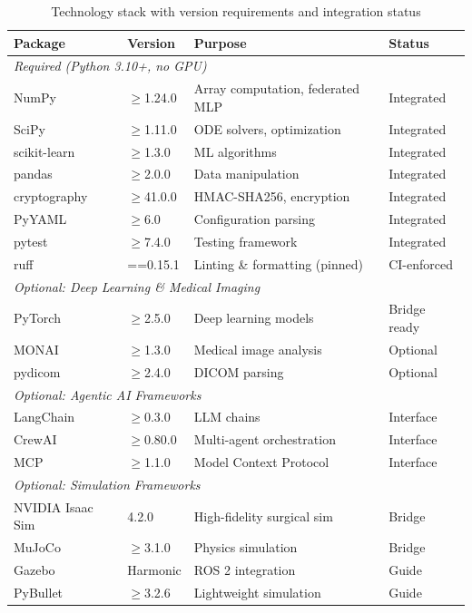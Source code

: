 \documentclass[10pt]{article}
\begin{document}
\begin{table}[H]
\centering
\caption{Technology stack with version requirements and integration status}
\label{tab:techstack}
\small
\begin{tabular}{@{}llll@{}}
\toprule
\textbf{Package} & \textbf{Version} & \textbf{Purpose} & \textbf{Status} \\
\midrule
\multicolumn{4}{l}{\textit{Required (Python 3.10+, no GPU)}} \\
NumPy & $\geq$1.24.0 & Array computation, federated MLP & Integrated \\
SciPy & $\geq$1.11.0 & ODE solvers, optimization & Integrated \\
scikit-learn & $\geq$1.3.0 & ML algorithms & Integrated \\
pandas & $\geq$2.0.0 & Data manipulation & Integrated \\
cryptography & $\geq$41.0.0 & HMAC-SHA256, encryption & Integrated \\
PyYAML & $\geq$6.0 & Configuration parsing & Integrated \\
pytest & $\geq$7.4.0 & Testing framework & Integrated \\
ruff & ==0.15.1 & Linting \& formatting (pinned) & CI-enforced \\
\midrule
\multicolumn{4}{l}{\textit{Optional: Deep Learning \& Medical Imaging}} \\
PyTorch & $\geq$2.5.0 & Deep learning models & Bridge ready \\
MONAI & $\geq$1.3.0 & Medical image analysis & Optional \\
pydicom & $\geq$2.4.0 & DICOM parsing & Optional \\
\midrule
\multicolumn{4}{l}{\textit{Optional: Agentic AI Frameworks}} \\
LangChain & $\geq$0.3.0 & LLM chains & Interface \\
CrewAI & $\geq$0.80.0 & Multi-agent orchestration & Interface \\
MCP & $\geq$1.1.0 & Model Context Protocol & Interface \\
\midrule
\multicolumn{4}{l}{\textit{Optional: Simulation Frameworks}} \\
NVIDIA Isaac Sim & 4.2.0 & High-fidelity surgical sim & Bridge \\
MuJoCo & $\geq$3.1.0 & Physics simulation & Bridge \\
Gazebo & Harmonic & ROS 2 integration & Guide \\
PyBullet & $\geq$3.2.6 & Lightweight simulation & Guide \\
\bottomrule
\end{tabular}
\end{table}
\end{document}

